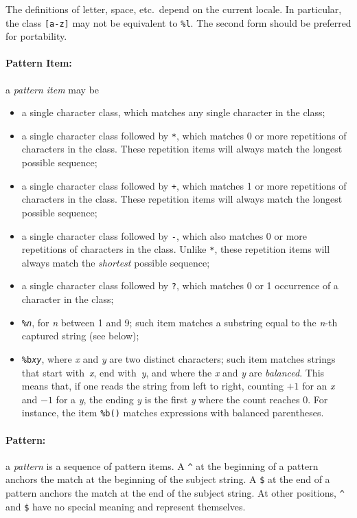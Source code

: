 \documentclass[11pt,twoside,draft]{article}
\newcommand{\M}[1]{{\rm\emph{#1}}}
\newcommand{\T}[1]{{\tt #1}}
\newcommand{\Math}[1]{$#1$}
\newcommand{\Def}[1]{\emph{#1}\index{#1}}
\begin{document}
The definitions of letter, space, etc.\ depend on the current locale.
In particular, the class \verb|[a-z]| may not be equivalent to \verb|%l|.
The second form should be preferred for portability.

\paragraph{Pattern Item:}
a \Def{pattern item} may be
\begin{itemize}
\item
a single character class,
which matches any single character in the class;
\item
a single character class followed by \verb|*|,
which matches 0 or more repetitions of characters in the class.
These repetition items will always match the longest possible sequence;
\item
a single character class followed by \verb|+|,
which matches 1 or more repetitions of characters in the class.
These repetition items will always match the longest possible sequence;
\item
a single character class followed by \verb|-|,
which also matches 0 or more repetitions of characters in the class.
Unlike \verb|*|,
these repetition items will always match the \emph{shortest} possible sequence;
\item
a single character class followed by \verb|?|,
which matches 0 or 1 occurrence of a character in the class;
\item
\T{\%\M{n}}, for \M{n} between 1 and 9;
such item matches a substring equal to the \M{n}-th captured string
(see below);
\item
\T{\%b\M{xy}}, where \M{x} and \M{y} are two distinct characters;
such item matches strings that start with~\M{x}, end with~\M{y},
and where the \M{x} and \M{y} are \emph{balanced}.
This means that, if one reads the string from left to right,
counting \Math{+1} for an \M{x} and \Math{-1} for a \M{y},
the ending \M{y} is the first \M{y} where the count reaches 0.
For instance, the item \verb|%b()| matches expressions with
balanced parentheses.
\end{itemize}

\paragraph{Pattern:}
a \Def{pattern} is a sequence of pattern items.
A \verb|^| at the beginning of a pattern anchors the match at the
beginning of the subject string.
A \verb|$| at the end of a pattern anchors the match at the
end of the subject string.
At other positions,
\verb|^| and \verb|$| have no special meaning and represent themselves.
\end{document}
